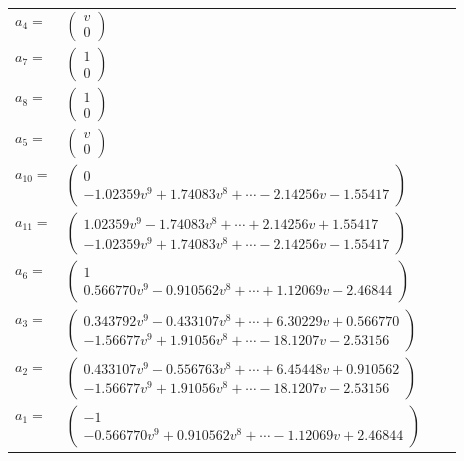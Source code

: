 \documentclass[1p]{elsarticle_modified}
\theoremstyle{definition}
\begin{document}
\begin{tabular}{m{7pt} m{180pt} m{7pt} m{180pt} }
\flushright $a_{4}=$&$\begin{pmatrix}v\\0\end{pmatrix}$ \\
\flushright $a_{7}=$&$\begin{pmatrix}1\\0\end{pmatrix}$ \\
\flushright $a_{8}=$&$\begin{pmatrix}1\\0\end{pmatrix}$ \\
\flushright $a_{5}=$&$\begin{pmatrix}v\\0\end{pmatrix}$ \\
\flushright $a_{10}=$&$\begin{pmatrix}0\\-1.02359 v^{9}+1.74083 v^{8}+\cdots-2.14256 v-1.55417\end{pmatrix}$ \\
\flushright $a_{11}=$&$\begin{pmatrix}1.02359 v^{9}-1.74083 v^{8}+\cdots+2.14256 v+1.55417\\-1.02359 v^{9}+1.74083 v^{8}+\cdots-2.14256 v-1.55417\end{pmatrix}$ \\
\flushright $a_{6}=$&$\begin{pmatrix}1\\0.566770 v^{9}-0.910562 v^{8}+\cdots+1.12069 v-2.46844\end{pmatrix}$ \\
\flushright $a_{3}=$&$\begin{pmatrix}0.343792 v^{9}-0.433107 v^{8}+\cdots+6.30229 v+0.566770\\-1.56677 v^{9}+1.91056 v^{8}+\cdots-18.1207 v-2.53156\end{pmatrix}$ \\
\flushright $a_{2}=$&$\begin{pmatrix}0.433107 v^{9}-0.556763 v^{8}+\cdots+6.45448 v+0.910562\\-1.56677 v^{9}+1.91056 v^{8}+\cdots-18.1207 v-2.53156\end{pmatrix}$ \\
\flushright $a_{1}=$&$\begin{pmatrix}-1\\-0.566770 v^{9}+0.910562 v^{8}+\cdots-1.12069 v+2.46844\end{pmatrix}$ \\

\end{tabular}
\end{document}
